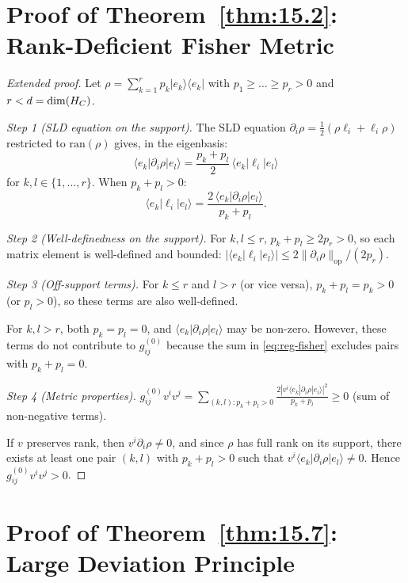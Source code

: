 \section{Proof of Theorem~\ref{thm:15.2}: Rank-Deficient Fisher Metric}
\label{app:pf-rank-deficient}

\begin{proof}[Extended proof]
Let $\rho = \sum_{k=1}^r p_k |e_k\rangle\langle e_k|$ with
$p_1 \geq \ldots \geq p_r > 0$ and $r < d = \dim(H_C)$.

\emph{Step 1 (SLD equation on the support).}
The SLD equation $\partial_i\rho = \frac{1}{2}(\rho\ell_i + \ell_i\rho)$
restricted to $\mathrm{ran}(\rho)$ gives, in the eigenbasis:
\[
  \langle e_k|\partial_i\rho|e_l\rangle
  = \frac{p_k + p_l}{2}\,\langle e_k|\ell_i|e_l\rangle
\]
for $k, l \in \{1, \ldots, r\}$.  When $p_k + p_l > 0$:
\[
  \langle e_k|\ell_i|e_l\rangle
  = \frac{2\,\langle e_k|\partial_i\rho|e_l\rangle}{p_k + p_l}.
\]

\emph{Step 2 (Well-definedness on the support).}
For $k, l \leq r$, $p_k + p_l \geq 2p_r > 0$, so each matrix element
is well-defined and bounded:
$|\langle e_k|\ell_i|e_l\rangle| \leq
2\|\partial_i\rho\|_{\mathrm{op}} / (2p_r)$.

\emph{Step 3 (Off-support terms).}
For $k \leq r$ and $l > r$ (or vice versa), $p_k + p_l = p_k > 0$
(or $p_l > 0$), so these terms are also well-defined.

For $k, l > r$, both $p_k = p_l = 0$, and
$\langle e_k|\partial_i\rho|e_l\rangle$ may be non-zero.  However,
these terms do not contribute to $g_{ij}^{(0)}$ because the sum in
\eqref{eq:reg-fisher} excludes pairs with $p_k + p_l = 0$.

\emph{Step 4 (Metric properties).}
$g_{ij}^{(0)} v^i v^j = \sum_{(k,l): p_k+p_l>0}
\frac{2|v^i\langle e_k|\partial_i\rho|e_l\rangle|^2}{p_k+p_l} \geq 0$
(sum of non-negative terms).

If $v$ preserves rank, then $v^i\partial_i\rho \neq 0$, and since
$\rho$ has full rank on its support, there exists at least one pair
$(k,l)$ with $p_k + p_l > 0$ such that
$v^i\langle e_k|\partial_i\rho|e_l\rangle \neq 0$.  Hence
$g_{ij}^{(0)} v^i v^j > 0$.
\end{proof}

\section{Proof of Theorem~\ref{thm:15.7}: Large Deviation Principle}
\label{app:pf-ldp}

